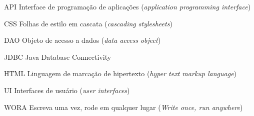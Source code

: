 \begin{siglas}
	\item[API] Interface de programação de aplicações (\textit{application programming interface})
	\item[CSS] Folhas de estilo em cascata (\textit{cascading stylesheets})
	\item[DAO] Objeto de acesso a dados (\textit{data access object})
	\item[JDBC] Java Database Connectivity
	\item[HTML] Linguagem de marcação de hipertexto (\textit{hyper text markup language})
	\item[UI] Interfaces de usuário (\textit{user interfaces})
	\item[WORA] Escreva uma vez, rode em qualquer lugar (\textit{Write once, run anywhere})
\end{siglas}

\tableofcontents*
